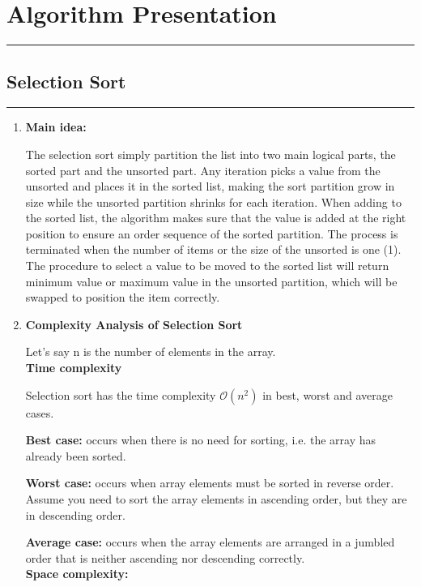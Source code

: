 \documentclass[11pt,a4paper]{article}
\begin{document}
{	\section{Algorithm Presentation}
		\rule{15cm}{0.1cm}
		\centering \subsection{Selection Sort}
		\rule{15cm}{0.1cm}
			\begin{enumerate}[label=\textbf{\arabic*})]
				\item \textbf{Main idea:}
				
				The selection sort simply partition the list into two main logical parts, the sorted part and the unsorted part. Any iteration picks a value from the unsorted and places it in the sorted list, making the sort partition grow in size while the unsorted partition shrinks for each iteration. When adding to the sorted list, the algorithm makes sure that the value is added at the right position to ensure an order sequence of the sorted partition. The process is terminated when the number of items or the size of the unsorted is one (1). The procedure to select a value to be moved to the sorted list will return minimum value or maximum value in the unsorted partition, which will be swapped to position the item correctly. 
				\\[12pt]
				\item \textbf{Complexity Analysis of Selection Sort}
					
					Let’s say n is the number of elements in the array. 
					\\[9pt]
					\textbf{Time complexity}
					
					Selection sort has the time complexity $\mathcal{O}(n^2)$ in best, worst and average cases.
					
					\textbf{Best case:} occurs when there is no need for sorting, i.e. the array has already been sorted.
					
					\textbf{Worst case:} occurs when array elements must be sorted in reverse order. Assume you need to sort the array elements in ascending order, but they are in descending order.
					
					\textbf{Average case:} occurs when the array elements are arranged in a jumbled order that is neither ascending nor descending correctly.
					\\[9pt]
					\textbf{Space complexity:}
					

\end{enumerate}}
\end{document}
